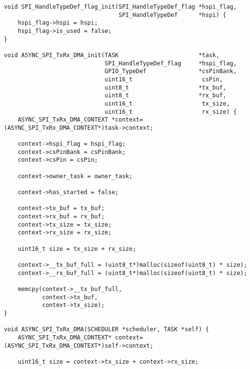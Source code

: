 \begin{lstlisting}[style=prog, frame=shadowbox, caption={Implémentation des outlis spi suplémentaires (tools.c)}, label={lst:tools_c},
    emph={[1]malloc, free, memcpy, SPI_HandleTypeDef_flag_init, ASYNC_SPI_TxRx_DMA_init, ASYNC_SPI_TxRx_DMA, add_task, kill_task, run_task,
    run_scheduler, HAL_GPIO_WritePin, HAL_SPI_TransmitReceive_DMA, HAL_SPI_STATE_READY, GPIO_PIN_SET, GPIO_PIN_RESET}, emphstyle={[1]\color{C}},
    emph={[2]GPIO_TypeDef, SCHEDULER, TASK, SPI_HandleTypeDef, SPI_HandleTypeDef_flag, ASYNC_DMA_STATE, ASYNC_SPI_TxRx_DMA_CONTEXT}, emphstyle={[2]\color{E}}]
void SPI_HandleTypeDef_flag_init(SPI_HandleTypeDef_flag *hspi_flag,
                                 SPI_HandleTypeDef      *hspi) {
    hspi_flag->hspi = hspi;
    hspi_flag->is_used = false;
}

void ASYNC_SPI_TxRx_DMA_init(TASK                       *task,
                             SPI_HandleTypeDef_flag     *hspi_flag,
                             GPIO_TypeDef               *csPinBank,
                             uint16_t                    csPin,
                             uint8_t                    *tx_buf,
                             uint8_t                    *rx_buf,
                             uint16_t                    tx_size,
                             uint16_t                    rx_size) {
    ASYNC_SPI_TxRx_DMA_CONTEXT *context=(ASYNC_SPI_TxRx_DMA_CONTEXT*)task->context;

    context->hspi_flag = hspi_flag;
    context->csPinBank = csPinBank;
    context->csPin = csPin;

    context->owner_task = owner_task;

    context->has_started = false;

    context->tx_buf = tx_buf;
    context->rx_buf = rx_buf;
    context->tx_size = tx_size;
    context->rx_size = rx_size;

    uint16_t size = tx_size + rx_size;

    context->__tx_buf_full = (uint8_t*)malloc(sizeof(uint8_t) * size);
    context->__rx_buf_full = (uint8_t*)malloc(sizeof(uint8_t) * size);

    memcpy(context->__tx_buf_full,
           context->tx_buf,
           context->tx_size);
}

void ASYNC_SPI_TxRx_DMA(SCHEDULER *scheduler, TASK *self) {
    ASYNC_SPI_TxRx_DMA_CONTEXT* context=(ASYNC_SPI_TxRx_DMA_CONTEXT*)self->context;

    uint16_t size = context->tx_size + context->rx_size;


\end{lstlisting}
